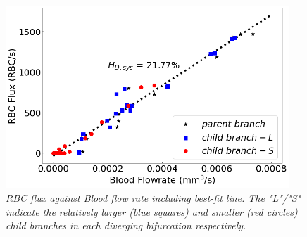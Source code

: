 \begin{figure}[H]
\centering
\includegraphics[width=0.95\textwidth]{images/SystemHaematocrit.png}
\caption{\textit{RBC flux against Blood flow rate including best-fit line. The "L"/"S" indicate the relatively larger (blue squares) and smaller (red circles) child branches in each diverging bifurcation respectively.} \label{SystemHaematocrit}}
\end{figure}
